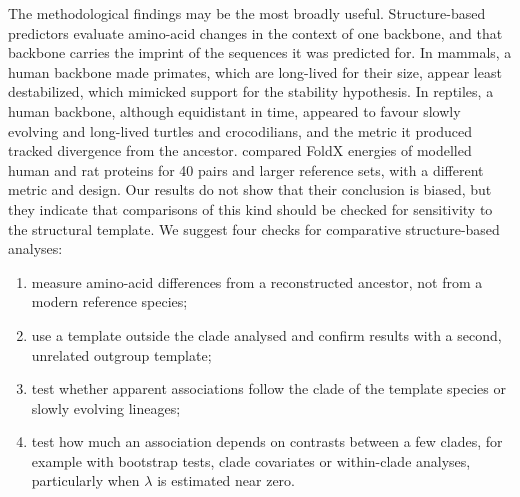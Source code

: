 \documentclass[11pt]{article}
\begin{document}
The methodological findings may be the most broadly useful. Structure-based predictors evaluate amino-acid changes in the context of one backbone, and that backbone carries the imprint of the sequences it was predicted for. In mammals, a human backbone made primates, which are long-lived for their size, appear least destabilized, which mimicked support for the stability hypothesis. In reptiles, a human backbone, although equidistant in time, appeared to favour slowly evolving and long-lived turtles and crocodilians, and the metric it produced tracked divergence from the ancestor. \citet{Farre2021} compared FoldX energies of modelled human and rat proteins for 40 pairs and larger reference sets, with a different metric and design. Our results do not show that their conclusion is biased, but they indicate that comparisons of this kind should be checked for sensitivity to the structural template. We suggest four checks for comparative structure-based analyses:
\begin{enumerate}[leftmargin=*,itemsep=0pt]
\item measure amino-acid differences from a reconstructed ancestor, not from a modern reference species;
\item use a template outside the clade analysed and confirm results with a second, unrelated outgroup template;
\item test whether apparent associations follow the clade of the template species or slowly evolving lineages;
\item test how much an association depends on contrasts between a few clades, for example with bootstrap tests, clade covariates or within-clade analyses, particularly when $\lambda$ is estimated near zero.
\end{enumerate}
\end{document}
